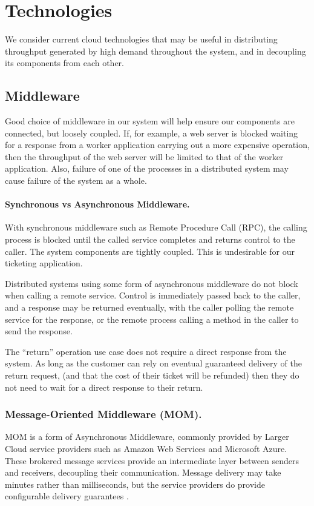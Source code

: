%
%

\section{Technologies}

We consider current cloud technologies that may be useful in distributing throughput generated by high demand throughout the system, and in decoupling its components from each other.

%
%

\subsection{Middleware}

Good choice of middleware in our system will help ensure our components are connected, but loosely coupled.  If, for example, a web server is blocked waiting for a response from a worker application carrying out a more expensive operation, then the throughput of the web server will be limited to that of the worker application.  Also, failure of one of the processes in a distributed system may cause failure of the system as a whole.

\paragraph{Synchronous vs Asynchronous Middleware.}
With synchronous middleware such as Remote Procedure Call (RPC), the calling process is blocked until the called service completes and returns control to the caller.  The system components are tightly coupled.  This is undesirable for our ticketing application.

Distributed systems using some form of asynchronous middleware do not block when calling a remote service.  Control is immediately passed back to the caller, and a response may be returned eventually, with the caller polling the remote service for the response, or the remote process calling a method in the caller to send the response.

The ``return'' operation use case does not require a direct response from the system.  As long as the customer can rely on eventual guaranteed delivery of the return request, (and that the cost of their ticket will be refunded) then they do not need to wait for a direct response to their return.

\subsubsection{Message-Oriented Middleware (MOM).}  MOM is a form of Asynchronous Middleware, commonly provided by Larger Cloud service providers such as Amazon Web Services and Microsoft Azure.  These brokered message services provide an intermediate layer between senders and receivers, decoupling their communication.  Message delivery may take minutes rather than milliseconds, but the service providers do provide configurable delivery guarantees \cite{curry2004message}.

